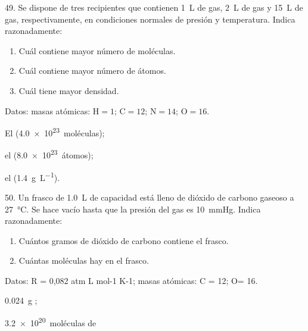 \documentclass[11pt]{article}
\begin{document}
\begin{multicols}{2}
\begin{exercise}
  49. Se dispone de tres recipientes que contienen \SI{1}{\liter} de  gas,
  \SI{2}{\liter} de  gas y \SI{15}{\liter} de  gas, respectivamente, en condiciones normales de presión y temperatura. Indica razonadamente:
  \begin{enumerate}
    \item Cuál contiene mayor número de moléculas.
    \item Cuál contiene mayor número de átomos.
    \item Cuál tiene mayor densidad.
  \end{enumerate}
  Datos: masas atómicas: $\textrm{H} = 1$; $\textrm{C} = 12$; $\textrm{N} = 14$; $\textrm{O} = 16$.
\end{exercise}
\begin{solution}
  \begin{enumerate*}
    \item El  (\SI{4.0e23}{moléculas});
    \item el  (\SI{8.0e23}{átomos});
    \item el  (\SI{1.4}{\gram\per\liter}).
  \end{enumerate*}
\end{solution}

\begin{exercise}
  50. Un frasco de \SI{1.0}{\liter} de capacidad está lleno de dióxido de carbono gaseoso a \SI{27}{\celsius}. Se hace vacío hasta que la presión del
  gas es \SI{10}{\mmHg}. Indica razonadamente:
  \begin{enumerate}
    \item Cuántos gramos de dióxido de carbono contiene el frasco.
    \item Cuántas moléculas hay en el frasco.
  \end{enumerate}
  Datos: R = 0,082 atm L mol-1 K-1; masas atómicas: C = 12; O= 16.
\end{exercise}
\begin{solution}
  \begin{enumerate*}
    \item \SI{0.024}{\gram} ;
    \item \SI{3.2e20}{moléculas} de 
  \end{enumerate*}
\end{solution}

\end{multicols}
\end{document}
